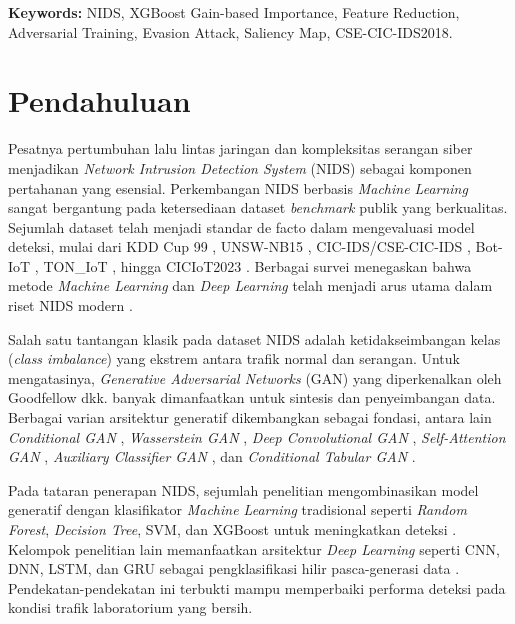 \documentclass[11pt, a4paper]{article}
\begin{document}
  \vspace{0.15cm}
  \noindent\small\textbf{Keywords:} NIDS, XGBoost Gain-based Importance, Feature Reduction, Adversarial Training, Evasion Attack, Saliency Map, CSE-CIC-IDS2018.

  \vspace{0.4cm}


\section{Pendahuluan}
Pesatnya pertumbuhan lalu lintas jaringan dan kompleksitas serangan siber menjadikan \textit{Network Intrusion Detection System} (NIDS) sebagai komponen pertahanan yang esensial. Perkembangan NIDS berbasis \textit{Machine Learning} sangat bergantung pada ketersediaan dataset \textit{benchmark} publik yang berkualitas. Sejumlah dataset telah menjadi standar de facto dalam mengevaluasi model deteksi, mulai dari KDD Cup 99 \cite{ref_kdd}, UNSW-NB15 \cite{ref_unsw}, CIC-IDS/CSE-CIC-IDS \cite{ref_cicids}, Bot-IoT \cite{ref_botiot}, TON\_IoT \cite{ref_toniot}, hingga CICIoT2023 \cite{ref_ciciot}. Berbagai survei menegaskan bahwa metode \textit{Machine Learning} dan \textit{Deep Learning} telah menjadi arus utama dalam riset NIDS modern \cite{ref_review_gan, ref_survey_malware, ref_tutorial_gan}.

Salah satu tantangan klasik pada dataset NIDS adalah ketidakseimbangan kelas (\textit{class imbalance}) yang ekstrem antara trafik normal dan serangan. Untuk mengatasinya, \textit{Generative Adversarial Networks} (GAN) yang diperkenalkan oleh Goodfellow dkk. \cite{ref_gan} banyak dimanfaatkan untuk sintesis dan penyeimbangan data. Berbagai varian arsitektur generatif dikembangkan sebagai fondasi, antara lain \textit{Conditional GAN} \cite{ref_cgan}, \textit{Wasserstein GAN} \cite{ref_wgan}, \textit{Deep Convolutional GAN} \cite{ref_dcgan}, \textit{Self-Attention GAN} \cite{ref_sagan}, \textit{Auxiliary Classifier GAN} \cite{ref_acgan}, dan \textit{Conditional Tabular GAN} \cite{ref_ctgan}.

Pada tataran penerapan NIDS, sejumlah penelitian mengombinasikan model generatif dengan klasifikator \textit{Machine Learning} tradisional seperti \textit{Random Forest}, \textit{Decision Tree}, SVM, dan XGBoost untuk meningkatkan deteksi \cite{ref_mari, ref_kumar, ref_ctgan_ids, ref_mcgan, ref_syngan, ref_cegan}. Kelompok penelitian lain memanfaatkan arsitektur \textit{Deep Learning} seperti CNN, DNN, LSTM, dan GRU sebagai pengklasifikasi hilir pasca-generasi data \cite{ref_tcn, ref_speacgan, ref_qgan, ref_tmggan, ref_park, ref_fewshot}. Pendekatan-pendekatan ini terbukti mampu memperbaiki performa deteksi pada kondisi trafik laboratorium yang bersih.
\end{document}
